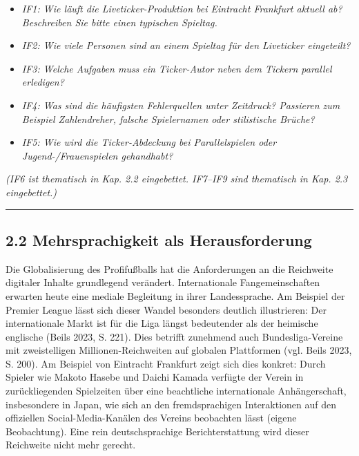 \begin{itemize}
\tightlist
\item
  \emph{IF1: Wie läuft die Liveticker-Produktion bei Eintracht Frankfurt
  aktuell ab? Beschreiben Sie bitte einen typischen Spieltag.}
\item
  \emph{IF2: Wie viele Personen sind an einem Spieltag für den
  Liveticker eingeteilt?}
\item
  \emph{IF3: Welche Aufgaben muss ein Ticker-Autor neben dem Tickern
  parallel erledigen?}
\item
  \emph{IF4: Was sind die häufigsten Fehlerquellen unter Zeitdruck?
  Passieren zum Beispiel Zahlendreher, falsche Spielernamen oder
  stilistische Brüche?}
\item
  \emph{IF5: Wie wird die Ticker-Abdeckung bei Parallelspielen oder
  Jugend-/Frauenspielen gehandhabt?}
\end{itemize}

\emph{(IF6 ist thematisch in Kap. 2.2 eingebettet. IF7--IF9 sind
thematisch in Kap. 2.3 eingebettet.)}

\begin{center}\rule{0.5\linewidth}{0.5pt}\end{center}

\subsection{2.2 Mehrsprachigkeit als
Herausforderung}\label{mehrsprachigkeit-als-herausforderung}

Die Globalisierung des Profifußballs hat die Anforderungen an die
Reichweite digitaler Inhalte grundlegend verändert. Internationale
Fangemeinschaften erwarten heute eine mediale Begleitung in ihrer
Landessprache. Am Beispiel der Premier League lässt sich dieser Wandel
besonders deutlich illustrieren: Der internationale Markt ist für die
Liga längst bedeutender als der heimische englische (Beils 2023, S.
221). Dies betrifft zunehmend auch Bundesliga-Vereine mit zweistelligen
Millionen-Reichweiten auf globalen Plattformen (vgl. Beils 2023, S.
200). Am Beispiel von Eintracht Frankfurt zeigt sich dies konkret: Durch
Spieler wie Makoto Hasebe und Daichi Kamada verfügte der Verein in
zurückliegenden Spielzeiten über eine beachtliche internationale
Anhängerschaft, insbesondere in Japan, wie sich an den fremdsprachigen
Interaktionen auf den offiziellen Social-Media-Kanälen des Vereins
beobachten lässt (eigene Beobachtung). Eine rein deutschsprachige
Berichterstattung wird dieser Reichweite nicht mehr gerecht.

